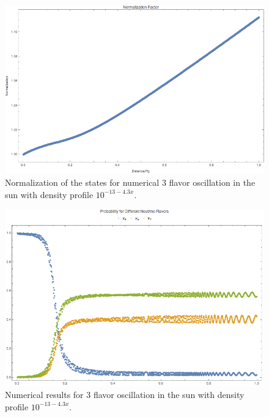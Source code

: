 \documentclass{tufte-handout}
\begin{document}
\begin{figure}
\centering
\includegraphics{assets/numericalMSW3Flavor-2-norm}
\caption{Normalization of the states for numerical 3 flavor oscillation in the sun with density profile $10^{-13 - 4.3 x}$.}
\label{fig:numericalMSW3Flavor-2-norm}
\end{figure}


\begin{figure}
\centering
\includegraphics{assets/numericalMSW3Flavor-2-probability}
\caption{Numerical results for 3 flavor oscillation in the sun with density profile $10^{-13 - 4.3 x}$.}
\label{fig:numericalMSW3Flavor-2-probability}
\end{figure}
\end{document}
